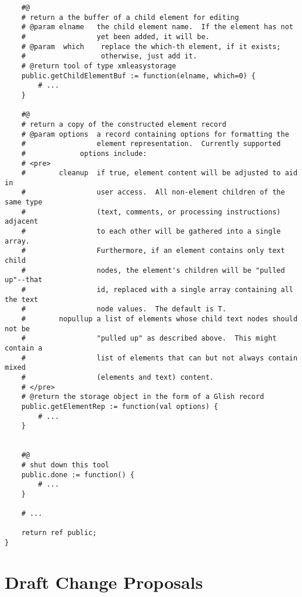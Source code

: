 \begin{verbatim}
    #@
    # return a the buffer of a child element for editing
    # @param elname   the child element name.  If the element has not
    #                 yet been added, it will be.
    # @param  which    replace the which-th element, if it exists;
    #                  otherwise, just add it.
    # @return tool of type xmleasystorage 
    public.getChildElementBuf := function(elname, which=0) {
        # ...
    }

    #@
    # return a copy of the constructed element record 
    # @param options  a record containing options for formatting the
    #                 element representation.  Currently supported
    #		      options include:
    # <pre>                
    #        cleanup  if true, element content will be adjusted to aid in 
    #                 user access.  All non-element children of the same type 
    #                 (text, comments, or processing instructions) adjacent
    #                 to each other will be gathered into a single array.
    #                 Furthermore, if an element contains only text child 
    #                 nodes, the element's children will be "pulled up"--that 
    #                 id, replaced with a single array containing all the text
    #                 node values.  The default is T.
    #        nopullup a list of elements whose child text nodes should not be
    #                 "pulled up" as described above.  This might contain a 
    #                 list of elements that can but not always contain mixed
    #                 (elements and text) content.  
    # </pre>
    # @return the storage object in the form of a Glish record
    public.getElementRep := function(val options) {
        # ... 
    }


    #@
    # shut down this tool
    public.done := function() {
        # ... 
    }

    # ...

    return ref public;
}
\end{verbatim}
	
    
	




\section{Draft Change Proposals}

